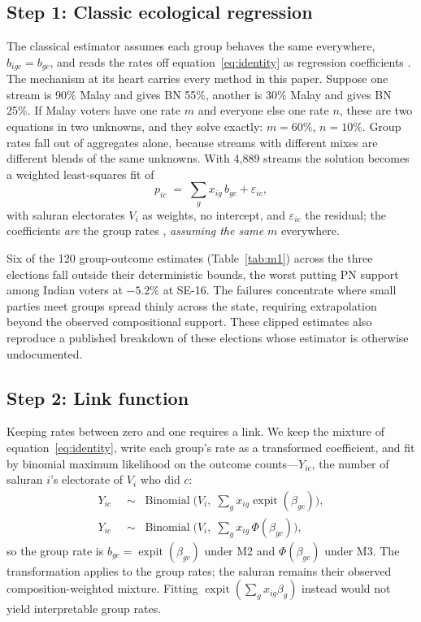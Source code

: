 \documentclass[11pt]{article}
\begin{document}
\subsection{Step 1: Classic ecological regression}
\label{sec:strategy-lpm}

The classical estimator assumes each group behaves the same everywhere, $b_{igc}=b_{gc}$, and reads the rates off equation~\eqref{eq:identity} as regression coefficients \cite{goodman1953}. The mechanism at its heart carries every method in this paper. Suppose one stream is 90\% Malay and gives BN 55\%, another is 30\% Malay and gives BN 25\%. If Malay voters have one rate $m$ and everyone else one rate $n$, these are two equations in two unknowns, and they solve exactly: $m=60\%$, $n=10\%$. Group rates fall out of aggregates alone, because streams with different mixes are different blends of the same unknowns. With 4,889 streams the solution becomes a weighted least-squares fit of
\begin{equation}
	p_{ic} \;=\; \sum_g x_{ig}\, b_{gc} + \varepsilon_{ic},
	\tag{M1}\label{eq:m1}
\end{equation}
with saluran electorates $V_i$ as weights, no intercept, and $\varepsilon_{ic}$ the residual; the coefficients \emph{are} the group rates \cite{goodman1953}, \emph{assuming the same} $m$ everywhere.

Six of the 120 group-outcome estimates (Table~\ref{tab:m1}) across the three elections fall outside their deterministic bounds, the worst putting PN support among Indian voters at $-5.2\%$ at SE-16. The failures concentrate where small parties meet groups spread thinly across the state, requiring extrapolation beyond the observed compositional support. These clipped estimates also reproduce a published breakdown of these elections whose estimator is otherwise undocumented.



\subsection{Step 2: Link function}
\label{sec:strategy-link}

Keeping rates between zero and one requires a link. We keep the mixture of equation~\eqref{eq:identity}, write each group's rate as a transformed coefficient, and fit by binomial maximum likelihood on the outcome counts---$Y_{ic}$, the number of saluran $i$'s electorate of $V_i$ who did $c$:
\begin{align}
	Y_{ic} & \;\sim\; \operatorname{Binomial}\!\Big(V_i,\; \sum_g x_{ig}\operatorname{expit}(\beta_{gc})\Big),
	\tag{M2, logit}\label{eq:m2}                                                                               \\
	Y_{ic} & \;\sim\; \operatorname{Binomial}\!\Big(V_i,\; \sum_g x_{ig}\,\Phi(\beta_{gc})\Big),
	\tag{M3, probit}\label{eq:m3}
\end{align}
so the group rate is $b_{gc}=\operatorname{expit}(\beta_{gc})$ under M2 and $\Phi(\beta_{gc})$ under M3. The transformation applies to the group rates; the saluran remains their observed composition-weighted mixture. Fitting $\operatorname{expit}(\sum_g x_{ig}\beta_g)$ instead would not yield interpretable group rates.
\end{document}
